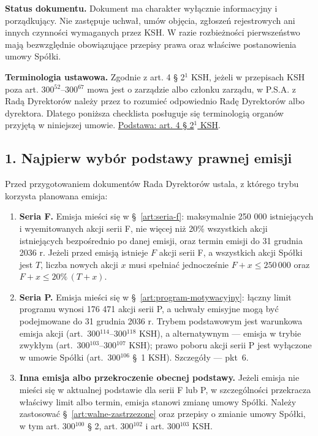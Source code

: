 \documentclass[12pt,a4paper]{report}
\begin{document}
\textbf{Status dokumentu.} Dokument ma charakter wyłącznie informacyjny i porządkujący. Nie zastępuje uchwał, umów objęcia, zgłoszeń rejestrowych ani innych czynności wymaganych przez KSH. W razie rozbieżności pierwszeństwo mają bezwzględnie obowiązujące przepisy prawa oraz właściwe postanowienia umowy Spółki.

\textbf{Terminologia ustawowa.} Zgodnie z art. 4 § 2$^{1}$ KSH, jeżeli w przepisach KSH poza art. 300$^{52}$--300$^{67}$ mowa jest o zarządzie albo członku zarządu, w P.S.A. z Radą Dyrektorów należy przez to rozumieć odpowiednio Radę Dyrektorów albo dyrektora. Dlatego poniższa checklista posługuje się terminologią organów przyjętą w niniejszej umowie. \href{https://eli.gov.pl/api/acts/DU/2024/18/text.html}{Podstawa: art. 4 § 2$^{1}$ KSH}.

\subsection*{1. Najpierw wybór podstawy prawnej emisji}

Przed przygotowaniem dokumentów Rada Dyrektorów ustala, z którego trybu korzysta planowana emisja:
\begin{enumerate}
  \item \textbf{Seria F.} Emisja mieści się w §~\ref{art:seria-f}: maksymalnie 250 000 istniejących i wyemitowanych akcji serii F, nie więcej niż 20\% wszystkich akcji istniejących bezpośrednio po danej emisji, oraz termin emisji do 31 grudnia 2036 r. Jeżeli przed emisją istnieje $F$ akcji serii F, a wszystkich akcji Spółki jest $T$, liczba nowych akcji $x$ musi spełniać jednocześnie $F+x\leq 250\,000$ oraz $F+x\leq 20\%\,(T+x)$.
  \item \textbf{Seria P.} Emisja mieści się w §~\ref{art:program-motywacyjny}: łączny limit programu wynosi 176 471 akcji serii P, a uchwały emisyjne mogą być podejmowane do 31 grudnia 2036 r. Trybem podstawowym jest warunkowa emisja akcji (art.~300$^{114}$--300$^{118}$ KSH), a alternatywnym --- emisja w trybie zwykłym (art.~300$^{103}$--300$^{107}$ KSH); prawo poboru akcji serii P jest wyłączone w umowie Spółki (art.~300$^{106}$ §~1 KSH). Szczegóły --- pkt~6.
  \item \textbf{Inna emisja albo przekroczenie obecnej podstawy.} Jeżeli emisja nie mieści się w aktualnej podstawie dla serii F lub P, w szczególności przekracza właściwy limit albo termin, emisja stanowi zmianę umowy Spółki. Należy zastosować §~\ref{art:walne-zastrzezone} oraz przepisy o zmianie umowy Spółki, w tym art. 300$^{100}$ § 2, art. 300$^{102}$ i art. 300$^{103}$ KSH.
\end{enumerate}
\end{document}
